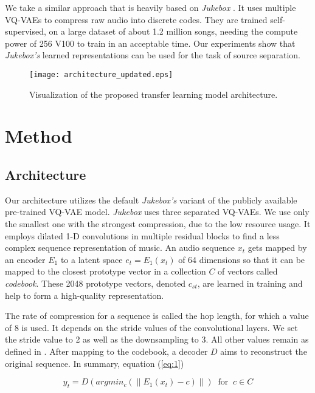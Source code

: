 \documentclass{llncs}
\begin{document}
We take a similar approach that is heavily based on \textit{Jukebox} \cite{dhariwal2020jukebox}. It uses multiple VQ-VAEs to compress raw audio into discrete codes. They are trained self-supervised, on a large dataset of about 1.2 million songs, needing the compute power of 256 V100 to train in an acceptable time. Our experiments show that \textit{Jukebox's} learned representations can be used for the task of source separation.

\begin{figure*}[ht]
 \centering
 \texttt{[image: architecture\_updated.eps]}
 \caption{Visualization of the proposed transfer learning model architecture.}
 \label{fig:fig1}
\end{figure*}


\section{Method}
\subsection{Architecture}

Our architecture utilizes the default \textit{Jukebox's} \cite{dhariwal2020jukebox} variant of the publicly available pre-trained VQ-VAE model. \textit{Jukebox} uses three separated VQ-VAEs. We use only the smallest one with the strongest compression, due to the low resource usage. It employs dilated 1-D convolutions in multiple residual blocks to find a less complex sequence representation of music. An audio sequence $x_t$ gets mapped by an encoder $E_1$ to a latent space $e_t=E_1(x_t)$ of 64 dimensions so that it can be mapped to the closest prototype vector in a collection $C$ of vectors called \textit{codebook}. These 2048 prototype vectors, denoted $c_{st}$, are learned in training and help to form a high-quality representation.

The rate of compression for a sequence is called the hop length, for which a value of 8 is used. It depends on the stride values of the convolutional layers. We set the stride value to 2 as well as the downsampling to 3. All other values remain as defined in \cite{dhariwal2020jukebox}. After mapping to the codebook, a decoder $D$ aims to reconstruct the original sequence. In summary, equation (\ref{eq:1})

\begin{equation}
\label{eq:1}
  y_t=D(argmin_{c}(\|E_1(x_t)- c)\|) \;\; \text{for} \;\; c \in C
\end{equation} 
\end{document}

